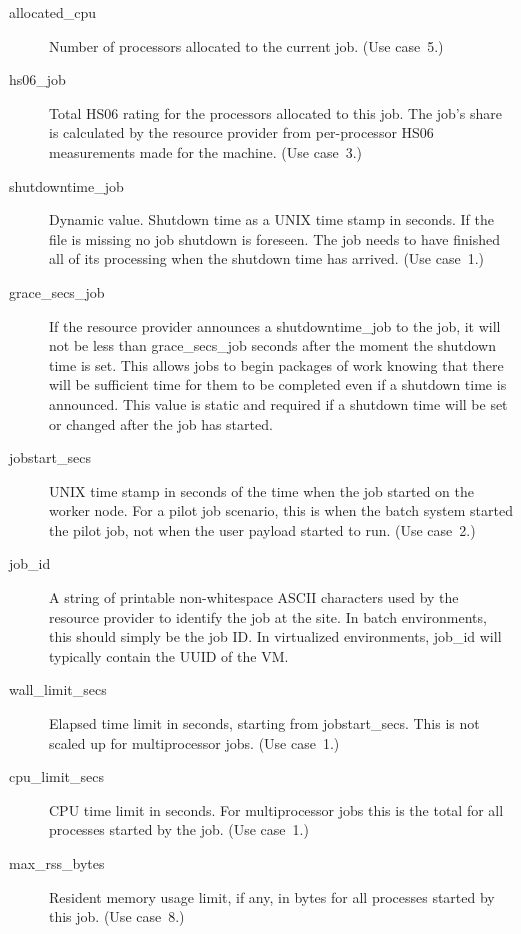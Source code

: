 \documentclass[12pt,a4paper]{article}
\begin{document}
\begin{description}

\item[allocated\_cpu] Number of processors allocated to the current job. 
(Use case~5.) 

\item[hs06\_job] Total HS06 rating for the processors allocated
to this job. The job's share is calculated by the resource provider from 
per-processor HS06 measurements made for the machine. (Use case~3.)

\item[shutdowntime\_job] Dynamic value. Shutdown time as a UNIX time 
stamp in seconds. If the file is missing no job shutdown
is foreseen. The job needs to have finished all of its processing when
the shutdown time has arrived. (Use case~1.)

\item[grace\_secs\_job] If the resource provider announces a
shutdowntime\_job to the job, it will not be less than grace\_secs\_job
seconds after the moment the shutdown time is set. This allows jobs to
begin packages of work knowing that there will be sufficient time for
them to be completed even if a shutdown time is announced.
This value is static and required if a shutdown time will be set or changed
after the job has started.

\item[jobstart\_secs] UNIX time stamp in seconds of the time when the job 
started on the worker node. For a pilot job scenario, this is when the 
batch system started the pilot job, not when the user payload started to 
run. (Use case~2.)

\item[job\_id] A string of printable non-whitespace ASCII characters
used by the resource provider to
identify the job at the site. In batch environments, this should simply be
the job ID. In virtualized environments, job\_id will typically contain the
UUID of the VM.

\item[wall\_limit\_secs] Elapsed time limit in seconds, starting from
jobstart\_secs. This is not scaled up for multiprocessor jobs.
(Use case~1.)

\item[cpu\_limit\_secs] CPU time limit in seconds. For multiprocessor jobs
this is the total for all processes started by the job. (Use case~1.)

\item[max\_rss\_bytes] Resident memory usage limit, if any, in bytes
for all processes started by this job. (Use case~8.) 


\end{description}
\end{document}
